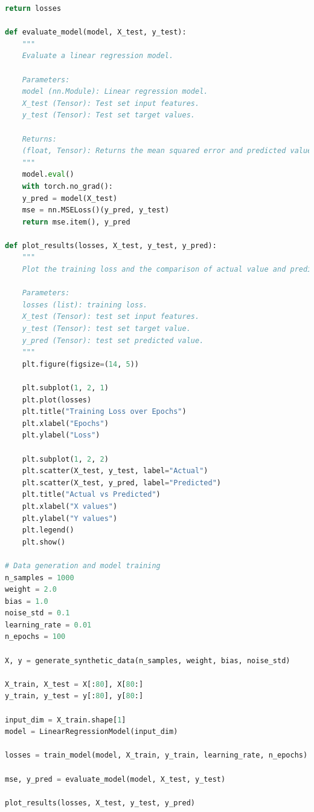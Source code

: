 \documentclass[a4paper,12pt]{article}
\begin{document}
\begin{lstlisting}[language=Python, caption=线性回归Python代码]
	return losses

def evaluate_model(model, X_test, y_test):
	"""
	Evaluate a linear regression model.

	Parameters:
	model (nn.Module): Linear regression model.
	X_test (Tensor): Test set input features.
	y_test (Tensor): Test set target values.

	Returns:
	(float, Tensor): Returns the mean squared error and predicted values.
	"""
	model.eval()
	with torch.no_grad():
	y_pred = model(X_test)
	mse = nn.MSELoss()(y_pred, y_test)
	return mse.item(), y_pred

def plot_results(losses, X_test, y_test, y_pred):
	"""
	Plot the training loss and the comparison of actual value and predicted value.
	
	Parameters:
	losses (list): training loss.
	X_test (Tensor): test set input features.
	y_test (Tensor): test set target value.
	y_pred (Tensor): test set predicted value.
	"""
	plt.figure(figsize=(14, 5))

	plt.subplot(1, 2, 1)
	plt.plot(losses)
	plt.title("Training Loss over Epochs")
	plt.xlabel("Epochs")
	plt.ylabel("Loss")

	plt.subplot(1, 2, 2)
	plt.scatter(X_test, y_test, label="Actual")
	plt.scatter(X_test, y_pred, label="Predicted")
	plt.title("Actual vs Predicted")
	plt.xlabel("X values")
	plt.ylabel("Y values")
	plt.legend()
	plt.show()
	
# Data generation and model training
n_samples = 1000
weight = 2.0
bias = 1.0
noise_std = 0.1
learning_rate = 0.01
n_epochs = 100

X, y = generate_synthetic_data(n_samples, weight, bias, noise_std)

X_train, X_test = X[:80], X[80:]
y_train, y_test = y[:80], y[80:]

input_dim = X_train.shape[1]
model = LinearRegressionModel(input_dim)

losses = train_model(model, X_train, y_train, learning_rate, n_epochs)

mse, y_pred = evaluate_model(model, X_test, y_test)

plot_results(losses, X_test, y_test, y_pred)
\end{lstlisting}
\end{document}
